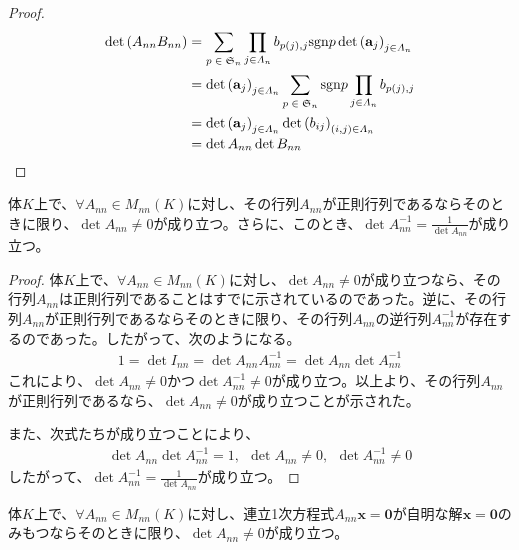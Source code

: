 \documentclass[dvipdfmx]{jsarticle}
\begin{document}
\begin{proof}
\begin{align*}
\det\left( A_{nn}B_{nn} \right) &= \sum_{\scriptsize \begin{matrix}
p \in \mathfrak{S}_{n} \\
\end{matrix}} {\prod_{j \in \varLambda_{n}} b_{p(j),j}{\mathrm{sgn} }p\det\left( \mathbf{a}_{j} \right)_{j \in \varLambda_{n}}}\\
&= \det\left( \mathbf{a}_{j} \right)_{j \in \varLambda_{n}}\sum_{\scriptsize \begin{matrix}
p \in \mathfrak{S}_{n} \\
\end{matrix}} {{\mathrm{sgn} }p\prod_{j \in \varLambda_{n}} b_{p(j),j}}\\
&= \det\left( \mathbf{a}_{j} \right)_{j \in \varLambda_{n}}\det\left( b_{ij} \right)_{(i,j) \in \varLambda_{n}}\\
&= \det A_{nn}\det B_{nn}
\end{align*}
\end{proof}
\begin{thm}\label{2.1.11.13}
体$K$上で、$\forall A_{nn} \in M_{nn}(K)$に対し、その行列$A_{nn}$が正則行列であるならそのときに限り、$\det A_{nn} \neq 0$が成り立つ。さらに、このとき、$\det A_{nn}^{- 1} = \frac{1}{\det A_{nn}}$が成り立つ。
\end{thm}
\begin{proof}
体$K$上で、$\forall A_{nn} \in M_{nn}(K)$に対し、$\det A_{nn} \neq 0$が成り立つなら、その行列$A_{nn}$は正則行列であることはすでに示されているのであった。逆に、その行列$A_{nn}$が正則行列であるならそのときに限り、その行列$A_{nn}$の逆行列$A_{nn}^{- 1}$が存在するのであった。したがって、次のようになる。
\begin{align*}
1 = \det I_{nn} = \det{A_{nn}A_{nn}^{- 1}} = \det A_{nn}\det A_{nn}^{- 1}
\end{align*}
これにより、$\det A_{nn} \neq 0$かつ$\det A_{nn}^{- 1} \neq 0$が成り立つ。以上より、その行列$A_{nn}$が正則行列であるなら、$\det A_{nn} \neq 0$が成り立つことが示された。\par
また、次式たちが成り立つことにより、
\begin{align*}
\det A_{nn}\det A_{nn}^{- 1} = 1,\ \ \det A_{nn} \neq 0,\ \ \det A_{nn}^{- 1} \neq 0
\end{align*}
したがって、$\det A_{nn}^{- 1} = \frac{1}{\det A_{nn}}$が成り立つ。
\end{proof}
\begin{thm}\label{2.1.11.14}
体$K$上で、$\forall A_{nn} \in M_{nn}(K)$に対し、連立1次方程式$A_{nn}\mathbf{x} = \mathbf{0}$が自明な解$\mathbf{x} = \mathbf{0}$のみもつならそのときに限り、$\det A_{nn} \neq 0$が成り立つ。
\end{thm}
\end{document}
